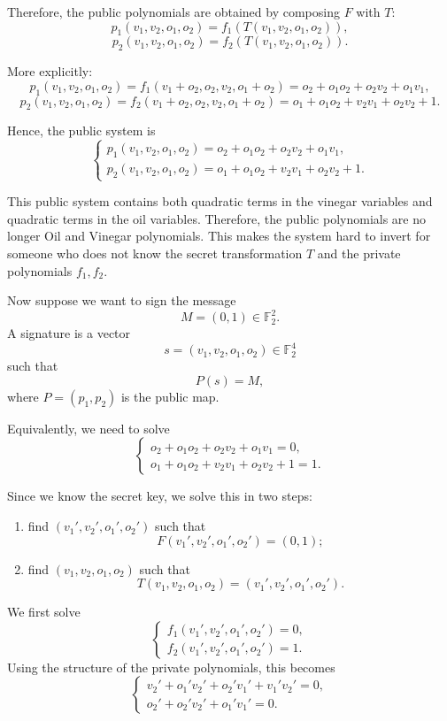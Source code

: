 \noindent
Therefore, the public polynomials are obtained by composing \(F\) with \(T\):
\[
p_1(v_1,v_2,o_1,o_2)
=
f_1(T(v_1,v_2,o_1,o_2)),
\]
\[
p_2(v_1,v_2,o_1,o_2)
=
f_2(T(v_1,v_2,o_1,o_2)).
\]

\noindent
More explicitly:
\[
p_1(v_1,v_2,o_1,o_2)
=
f_1(v_1+o_2,o_2,v_2,o_1+o_2)
=
o_2+o_1o_2+o_2v_2+o_1v_1,
\]
\[
p_2(v_1,v_2,o_1,o_2)
=
f_2(v_1+o_2,o_2,v_2,o_1+o_2)
=
o_1+o_1o_2+v_2v_1+o_2v_2+1.
\]

\noindent
Hence, the public system is
\[
\begin{cases}
p_1(v_1,v_2,o_1,o_2)
=
o_2+o_1o_2+o_2v_2+o_1v_1,\\
p_2(v_1,v_2,o_1,o_2)
=
o_1+o_1o_2+v_2v_1+o_2v_2+1.
\end{cases}
\]

\noindent
This public system contains both quadratic terms in the vinegar variables and quadratic terms in the oil variables. Therefore, the public polynomials are no longer Oil and Vinegar polynomials. This makes the system hard to invert for someone who does not know the secret transformation \(T\) and the private polynomials \(f_1,f_2\).

\bigskip

\noindent
Now suppose we want to sign the message
\[
M=(0,1)\in\mathbb F_2^2.
\]
A signature is a vector
\[
s=(v_1,v_2,o_1,o_2)\in\mathbb F_2^4
\]
such that
\[
P(s)=M,
\]
where \(P=(p_1,p_2)\) is the public map.

\noindent
Equivalently, we need to solve
\[
\begin{cases}
o_2+o_1o_2+o_2v_2+o_1v_1=0,\\
o_1+o_1o_2+v_2v_1+o_2v_2+1=1.
\end{cases}
\]

\noindent
Since we know the secret key, we solve this in two steps:
\begin{enumerate}
    \item find \((v_1',v_2',o_1',o_2')\) such that
    \[
    F(v_1',v_2',o_1',o_2')=(0,1);
    \]
    \item find \((v_1,v_2,o_1,o_2)\) such that
    \[
    T(v_1,v_2,o_1,o_2)=(v_1',v_2',o_1',o_2').
    \]
\end{enumerate}

\noindent
We first solve
\[
\begin{cases}
f_1(v_1',v_2',o_1',o_2')=0,\\
f_2(v_1',v_2',o_1',o_2')=1.
\end{cases}
\]
Using the structure of the private polynomials, this becomes
\[
\begin{cases}
v_2' + o_1'v_2' + o_2'v_1' + v_1'v_2' = 0,\\
o_2' + o_2'v_2' + o_1'v_1' = 0.
\end{cases}
\]

